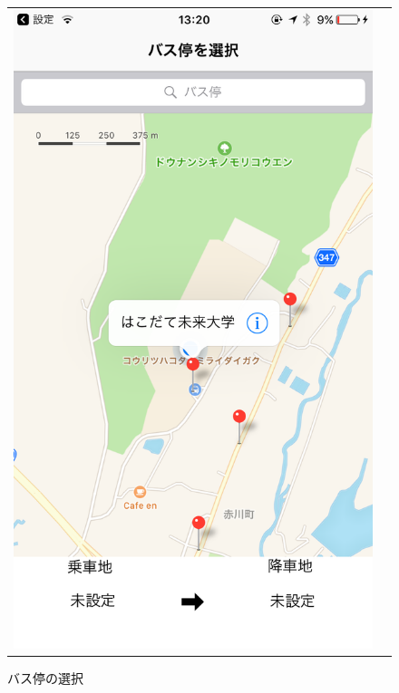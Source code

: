 \documentclass[openany,11pt,papersize]{jsbook}
\begin{document}
\begin{figure}[H]
    \begin{tabular}{cc}
      \begin{minipage}[t]{0.45\hsize}
        \centering
        \includegraphics[keepaspectratio, scale=0.2]{img/select.png}
        \caption{バス停の選択}
        \label{fig:select}
      \end{minipage} &

\end{tabular}
\end{figure}
\end{document}
